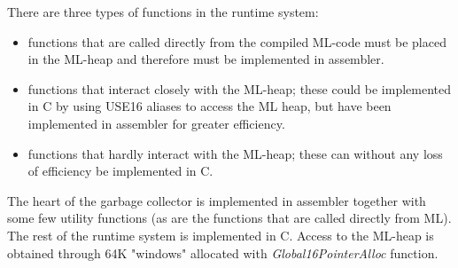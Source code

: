 There are three types of functions in the runtime system:
\begin{itemize}
\item 
functions that are called directly from the compiled ML-code must be
placed in the ML-heap and therefore must be implemented in assembler.
\item 
functions that interact closely with the ML-heap; these could be
implemented in C by using USE16 aliases to access the ML heap, but
have been implemented in assembler for greater efficiency.
\item
functions that hardly interact with the ML-heap; these can without any
 loss of efficiency be implemented in C.
\end{itemize}

The heart of the garbage collector is implemented in assembler
together with some few utility functions (as are the functions that
are called directly from ML). The rest of the runtime system is
implemented in C.  Access to the ML-heap is obtained through 64K
"windows" allocated with {\em Global16PointerAlloc\/} function.







